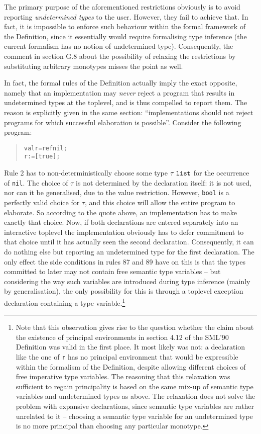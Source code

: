 \documentclass{article}
\begin{document}
The primary purpose of the aforementioned restrictions obviously is to avoid reporting {\em undetermined types} to the user. However, they fail to achieve that. In fact, it is impossible to enforce such behaviour within the formal framework of the Definition, since it essentially would require formalising type inference (the current formalism has no notion of undetermined type). Consequently, the comment in section G.8 about the possibility of relaxing the restrictions by substituting arbitrary monotypes misses the point as well.

In fact, the formal rules of the Definition actually imply the exact opposite, namely that an implementation may {\em never} reject a program that results in undetermined types at the toplevel, and is thus compelled to report them. The reason is explicitly given in the same section: ``implementations should not reject programs for which successful elaboration is possible''. Consider the following program:
\begin{quote}
\begin{alltt}
val r = ref nil;
r := [true];
\end{alltt}
\end{quote}
Rule 2 has to non-deterministically choose some type $\tau\;{\tt list}$ for the occurrence of {\tt nil}. The choice of $\tau$ is not determined by the declaration itself: it is not used, nor can it be generalised, due to the value restriction. However, {\tt bool} is a perfectly valid choice for $\tau$, and this choice will allow the entire program to elaborate. So according to the quote above, an implementation has to make exactly that choice. Now, if both declarations are entered separately into an interactive toplevel the implementation obviously has to defer commitment to that choice until it has actually seen the second declaration. Consequently, it can do nothing else but reporting an undetermined type for the first declaration. The only effect the side conditions in rules 87 and 89 have on this is that the types committed to later may not contain free semantic type variables -- but considering the way such variables are introduced during type inference (mainly by generalisation), the only possibility for this is through a toplevel exception declaration containing a type variable.\footnote{Note that this observation gives rise to the question whether the claim about the existence of principal environments in section 4.12 of the SML'90 Definition \cite{definition90} was valid in the first place. It most likely was not: a declaration like the one of {\tt r} has no principal environment that would be expressible within the formalism of the Definition, despite allowing different choices of free imperative type variables. The reasoning that this relaxation was sufficient to regain principality is based on the same mix-up of semantic type variables and undetermined types as above. The relaxation does not solve the problem with expansive declarations, since semantic type variables are rather unrelated to it -- choosing a semantic type variable for an undetermined type is no more principal than choosing any particular monotype.}
\end{document}
